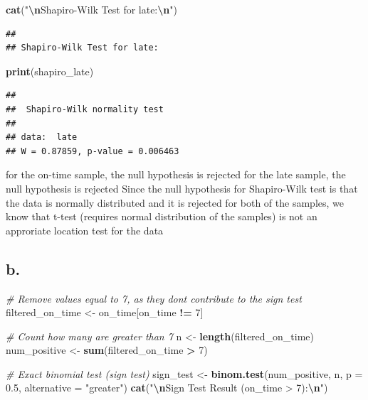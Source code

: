 \documentclass[
]{article}
\newenvironment{Shaded}{\begin{snugshade}}{\end{snugshade}}
\newcommand{\AttributeTok}[1]{\textcolor[rgb]{0.13,0.29,0.53}{#1}}
\newcommand{\CommentTok}[1]{\textcolor[rgb]{0.56,0.35,0.01}{\textit{#1}}}
\newcommand{\DecValTok}[1]{\textcolor[rgb]{0.00,0.00,0.81}{#1}}
\newcommand{\FloatTok}[1]{\textcolor[rgb]{0.00,0.00,0.81}{#1}}
\newcommand{\FunctionTok}[1]{\textcolor[rgb]{0.13,0.29,0.53}{\textbf{#1}}}
\newcommand{\NormalTok}[1]{#1}
\newcommand{\OtherTok}[1]{\textcolor[rgb]{0.56,0.35,0.01}{#1}}
\newcommand{\SpecialCharTok}[1]{\textcolor[rgb]{0.81,0.36,0.00}{\textbf{#1}}}
\newcommand{\StringTok}[1]{\textcolor[rgb]{0.31,0.60,0.02}{#1}}
\begin{document}
\begin{Shaded}
\begin{Highlighting}[]
\FunctionTok{cat}\NormalTok{(}\StringTok{"}\SpecialCharTok{\textbackslash{}n}\StringTok{Shapiro{-}Wilk Test for late:}\SpecialCharTok{\textbackslash{}n}\StringTok{"}\NormalTok{)}
\end{Highlighting}
\end{Shaded}

\begin{verbatim}
## 
## Shapiro-Wilk Test for late:
\end{verbatim}

\begin{Shaded}
\begin{Highlighting}[]
\FunctionTok{print}\NormalTok{(shapiro\_late)}
\end{Highlighting}
\end{Shaded}

\begin{verbatim}
## 
##  Shapiro-Wilk normality test
## 
## data:  late
## W = 0.87859, p-value = 0.006463
\end{verbatim}

for the on-time sample, the null hypothesis is rejected for the late
sample, the null hypothesis is rejected Since the null hypothesis for
Shapiro-Wilk test is that the data is normally distributed and it is
rejected for both of the samples, we know that t-test (requires normal
distribution of the samples) is not an approriate location test for the
data

\subsection{b.}\label{b.}

\begin{Shaded}
\begin{Highlighting}[]
\CommentTok{\# Remove values equal to 7, as they don\textquotesingle{}t contribute to the sign test}
\NormalTok{filtered\_on\_time }\OtherTok{\textless{}{-}}\NormalTok{ on\_time[on\_time }\SpecialCharTok{!=} \DecValTok{7}\NormalTok{]}

\CommentTok{\# Count how many are greater than 7}
\NormalTok{n }\OtherTok{\textless{}{-}} \FunctionTok{length}\NormalTok{(filtered\_on\_time)}
\NormalTok{num\_positive }\OtherTok{\textless{}{-}} \FunctionTok{sum}\NormalTok{(filtered\_on\_time }\SpecialCharTok{\textgreater{}} \DecValTok{7}\NormalTok{)}

\CommentTok{\# Exact binomial test (sign test)}
\NormalTok{sign\_test }\OtherTok{\textless{}{-}} \FunctionTok{binom.test}\NormalTok{(num\_positive, n, }\AttributeTok{p =} \FloatTok{0.5}\NormalTok{, }\AttributeTok{alternative =} \StringTok{"greater"}\NormalTok{)}
\FunctionTok{cat}\NormalTok{(}\StringTok{"}\SpecialCharTok{\textbackslash{}n}\StringTok{Sign Test Result (on\_time \textgreater{} 7):}\SpecialCharTok{\textbackslash{}n}\StringTok{"}\NormalTok{)}
\end{Highlighting}
\end{Shaded}
\end{document}
